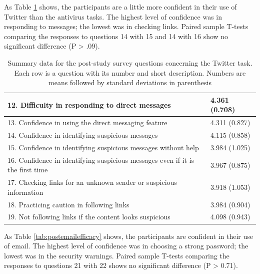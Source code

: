 As Table \ref{tab:posttwitefficacy} shows, the participants are a little more confident in their use of Twitter than the antivirus tasks. The highest level of confidence was in responding to messages; the lowest was in checking links. Paired sample T-tests comparing the responses to questions 14 with 15 and 14 with 16 show no significant difference (P > .09).
\begin{table}[tpb]
\caption{Summary data for the post-study survey questions concerning the Twitter task. Each
row is a question with its number and short description. Numbers are means followed by standard deviations in parenthesis}
\label{tab:posttwitefficacy}
\begin{tabular}{|ll|}
\hline
12. Difficulty in responding to direct messages         & 4.361 (0.708) \\ \hline
13. Confidence in using the direct messaging feature    & 4.311 (0.827) \\ \hline
14. Confidence in identifying suspicious messages       & 4.115 (0.858) \\ \hline
15. Confidence in identifying suspicious messages without help                 & 3.984 (1.025) \\ \hline
16. Confidence in identifying suspicious messages even if it is the first time & 3.967 (0.875) \\ \hline
17. Checking links for an unknown sender or suspicious information             & 3.918 (1.053) \\ \hline
18. Practicing caution in following links               & 3.984 (0.904) \\ \hline
19. Not following links if the content looks suspicious & 4.098 (0.943) \\ \hline
\end{tabular}
\end{table}

As Table \ref{tab:postemailefficacy} shows, the participants are confident in their use of email. The highest level of confidence was in choosing a strong password; the lowest was in the security warnings. Paired sample T-tests comparing the responses to questions 21 with 22 shows no significant difference (P > 0.71).

